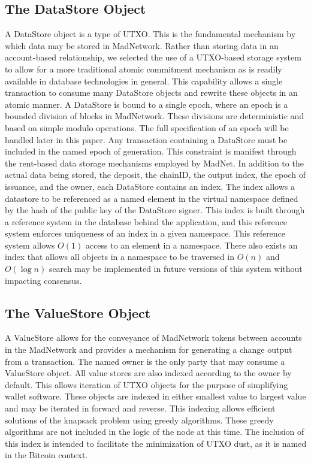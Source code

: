 \subsection{The DataStore Object}



A DataStore object is a type of UTXO.
This is the fundamental mechanism by which data may be stored in MadNetwork.
Rather than storing data in an account-based relationship, we selected
the use of a UTXO-based storage system to allow for a more traditional
atomic commitment mechanism as is readily available in database
technologies in general.
This capability allows a single transaction to consume many DataStore
objects and rewrite these objects in an atomic manner.
A DataStore is bound to a single epoch, where an epoch is a bounded
division of blocks in MadNetwork.
These divisions are deterministic and based on simple modulo operations.
The full specification of an epoch will be handled later in this paper.
Any transaction containing a DataStore must be included in the named
epoch of generation.
This constraint is manifest through the rent-based data storage
mechanisms employed by MadNet.
In addition to the actual data being stored, the deposit, the chainID,
the output index, the epoch of issuance, and the owner, each DataStore contains
an index.
The index allows a datastore to be referenced as a named element in the
virtual namespace defined by the hash of the public key of the
DataStore signer.
This index is built through a reference system in the database behind
the application, and this reference system enforces uniqueness of an
index in a given namespace.
This reference system allows $O(1)$ access to an element in a namespace.
There also exists an index that allows all objects in a namespace to be
traversed in $O(n)$ and $O(\log n)$ search may be implemented in future
versions of this system without impacting consensus.

\subsection{The ValueStore Object}



A ValueStore allows for the conveyance of MadNetwork tokens between
accounts in the MadNetwork and provides a mechanism for generating a
change output from a transaction.
The named owner is the only party that may consume a ValueStore object.
All value stores are also indexed according to the owner by default.
This allows iteration of UTXO objects for the purpose of simplifying
wallet software.
These objects are indexed in either smallest value to largest value and
may be iterated in forward and reverse.
This indexing allows efficient solutions of the knapsack problem using
greedy algorithms.
These greedy algorithms are not included in the logic of the node at
this time.
The inclusion of this index is intended to facilitate the minimization
of UTXO dust, as it is named in the Bitcoin context.


